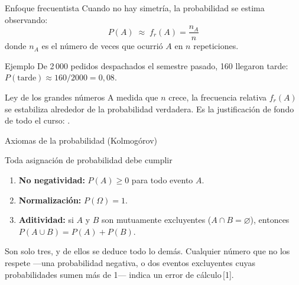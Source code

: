 \documentclass[aspectratio=169,10pt]{beamer}
\begin{document}
\begin{frame}{Enfoque frecuentista}
  Cuando no hay simetría, la probabilidad se estima observando:
  \[ P(A)\;\approx\; f_r(A)=\frac{n_A}{n} \]
  donde $n_A$ es el número de veces que ocurrió $A$ en $n$ repeticiones.

  \vspace{0.2cm}
  \begin{exampleblock}{Ejemplo}
    \footnotesize
    De 2\,000 pedidos despachados el semestre pasado, 160 llegaron tarde:
    $P(\text{tarde})\approx 160/2000 = 0{,}08$.
  \end{exampleblock}

  \vspace{0.15cm}
  \begin{alertblock}{Ley de los grandes números}
    \footnotesize
    A medida que $n$ crece, la frecuencia relativa $f_r(A)$ se estabiliza
    alrededor de la probabilidad verdadera. Es la justificación de fondo de
    todo el curso: .
  \end{alertblock}
\end{frame}

\begin{frame}{Axiomas de la probabilidad (Kolmogórov)}
  \begin{block}{Toda asignación de probabilidad debe cumplir}
    \small
    \begin{enumerate}
      \item \textbf{No negatividad:} $P(A)\ge 0$ para todo evento $A$.
      \item \textbf{Normalización:} $P(\Omega)=1$.
      \item \textbf{Aditividad:} si $A$ y $B$ son mutuamente excluyentes
            ($A\cap B=\varnothing$), entonces $P(A\cup B)=P(A)+P(B)$.
    \end{enumerate}
  \end{block}

  \vspace{0.25cm}
  {\footnotesize\color{uniGris} Son solo tres, y de ellos se deduce todo lo
  demás. Cualquier número que no los respete —una probabilidad negativa, o dos
  eventos excluyentes cuyas probabilidades sumen más de 1— indica un error de
  cálculo\,[1].}
\end{frame}
\end{document}
